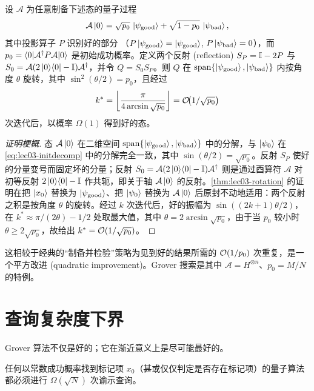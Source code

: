 \begin{theorem}
\label{thm:lec03-aa}
设 $\mathcal A$ 为任意制备下述态的量子过程
\[
  \mathcal A\ket{0}=\sqrt{p_0}\,\ket{\psi_{\mathrm{good}}}+\sqrt{1-p_0}\,\ket{\psi_{\mathrm{bad}}},
\]
其中投影算子 $P$ 识别好的部分
（$P\ket{\psi_{\mathrm{good}}}=\ket{\psi_{\mathrm{good}}}$,
$P\ket{\psi_{\mathrm{bad}}}=0$），而 $p_0=\braket{0|\mathcal A^{\dagger} P\mathcal A|0}$ 是初始成功概率。定义两个反射 (reflection)
$S_P=\mathbb{I}-2P$ 与 $S_0=\mathcal A(2\ket{0}\!\bra{0}-\mathbb{I})\mathcal A^{\dagger}$，并令
$Q=S_0S_P$。则 $Q$ 在 $\operatorname{span}\{\ket{\psi_{\mathrm{good}}},\ket{\psi_{\mathrm{bad}}}\}$ 内按角度 $\theta$ 旋转，其中
$\sin^{2}(\theta/2)=p_0$，且经过
\[
  k^{\ast}=\left\lfloor\frac{\pi}{4\arcsin\sqrt{p_0}}\right\rfloor
  =\mathcal{O}\!\bigl(1/\sqrt{p_0}\bigr)
\]
次迭代后，以概率 $\Omega(1)$ 得到好的态。
\end{theorem}

\begin{proof}[证明梗概]
态 $\mathcal A\ket{0}$ 在二维空间
$\operatorname{span}\{\ket{\psi_{\mathrm{good}}},\ket{\psi_{\mathrm{bad}}}\}$
中的分解，与 $\ket{\psi_0}$ 在 \eqref{eq:lec03-initdecomp} 中的分解完全一致，其中
$\sin(\theta/2)=\sqrt{p_0}$。反射 $S_P$ 使好的分量变号而固定坏的分量；反射 $S_0=\mathcal A(2\ket{0}\!\bra{0}-\mathbb{I})\mathcal A^{\dagger}$ 则是通过酉算符 $\mathcal A$ 对初等反射 $2\ket{0}\!\bra{0}-\mathbb{I}$ 作共轭，即关于轴 $\mathcal A\ket{0}$ 的反射。\cref{thm:lec03-rotation} 的证明在把 $\ket{x_0}$ 替换为 $\ket{\psi_{\mathrm{good}}}$、把 $\ket{\psi_0}$ 替换为 $\mathcal A\ket{0}$ 后原封不动地适用：两个反射之积是按角度 $\theta$ 的旋转。经过 $k$ 次迭代后，好的振幅为 $\sin((2k+1)\theta/2)$，在
$k^{\ast}\approx\pi/(2\theta)-1/2$ 处取最大值，其中 $\theta=2\arcsin\sqrt{p_0}$，由于当 $p_0$ 较小时 $\theta\ge2\sqrt{p_0}$，故给出
$k^{\ast}=\mathcal{O}(1/\sqrt{p_0})$。
\end{proof}

这相较于经典的“制备并检验”策略为见到好的结果所需的 $\mathcal{O}(1/p_0)$ 次重复，是一个平方改进 (quadratic improvement)。Grover 搜索是其中 $\mathcal A=H^{\otimes n}$、$p_0=M/N$ 的特例。

\section{查询复杂度下界}
\label{sec:lec03-5}

Grover 算法不仅是好的；它在渐近意义上是尽可能最好的。

\begin{theorem}
\label{thm:lec03-lower}
任何以常数成功概率找到标记项 $x_0$（甚或仅仅判定是否存在标记项）的量子算法都必须进行
$\Omega(\sqrt N)$ 次谕示查询。
\end{theorem}

